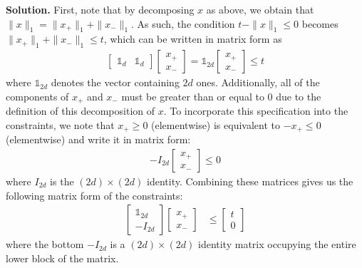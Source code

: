 \documentclass{letter}
\newcommand{\Solution}[1]{%
	\textbf{Solution.} #1 \par%
}
\begin{document}
    \Solution{First, note that by decomposing $x$ as above, we obtain that $\|x\|_1 = \|x_+\|_1 + \|x_-\|_1$. As such, the condition $t - \|x\|_1 \leq 0$ becomes $\|x_+\|_1 + \|x_-\|_1 \leq t$, which can be written in matrix form as \begin{align*}
        \begin{bmatrix} \mathbb{1}_d & \mathbb{1}_d \end{bmatrix} \begin{bmatrix} x_+ \\ x_- \end{bmatrix} = \mathbb{1}_{2d} \begin{bmatrix} x_+ \\ x_- \end{bmatrix} \leq t
    \end{align*} where $\mathbb{1}_{2d}$ denotes the vector containing $2d$ ones. Additionally, all of the components of $x_+$ and $x_-$ must be greater than or equal to 0 due to the definition of this decomposition of $x$. To incorporate this specification into the constraints, we note that $x_+ \geq 0$ (elementwise) is equivalent to $-x_+ \leq 0$ (elementwise) and write it in matrix form: \begin{align*}
        -I_{2d} \begin{bmatrix} x_+ \\ x_- \end{bmatrix} \leq 0
    \end{align*} where $I_{2d}$ is the $(2d) \times (2d)$ identity. Combining these matrices gives us the following matrix form of the constraints: \begin{align*}
        \begin{bmatrix} \mathbb{1}_{2d} \\ -I_{2d} \end{bmatrix} \begin{bmatrix} x_+ \\ x_- \end{bmatrix} &\leq \begin{bmatrix} t \\ 0 \end{bmatrix}
    \end{align*} where the bottom $-I_{2d}$ is a $(2d) \times (2d)$ identity matrix occupying the entire lower block of the matrix. 
    
}
\end{document}
